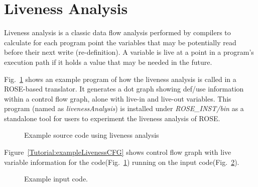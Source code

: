 \clearpage
\section{Liveness Analysis}
Liveness analysis is a classic data flow analysis performed by compilers to
calculate for each program point the variables that may be potentially read
before their next write (re-definition).
A variable is live at a point in a program's execution path
if it holds a value that may be needed in the future. 

Fig.~\ref{Tutorial:livenessCode} shows an example program of how the
liveness analysis
is called in a ROSE-based translator. 
It generates a dot graph showing def/use information within
a control flow graph, alone with live-in and live-out variables. 
This program (named as \textit{livenessAnalysis})
is installed under \textit{ROSE\_INST/bin} as a standalone tool for users
to experiment the liveness analysis of ROSE.

\begin{figure}[!h]
{\indent
{\mySmallFontSize
\begin{latexonly}
   
\end{latexonly}

\begin{htmlonly}
   
\end{htmlonly}

}
}
\caption{Example source code using liveness analysis}
\label{Tutorial:livenessCode}
\end{figure}

Figure~\ref{Tutorial:exampleLivenessCFG} shows control flow graph with live
variable information for the
code(Fig.~\ref{Tutorial:livenessCode}) running on the input
code(Fig.~\ref{Tutorial:exampleLivenessInput}). 

\begin{figure}[!h]
{\indent
{\mySmallFontSize

\begin{latexonly}
   
\end{latexonly}

\begin{htmlonly}
   
\end{htmlonly}

}
}
\caption{Example input code.}
\label{Tutorial:exampleLivenessInput}
\end{figure}



